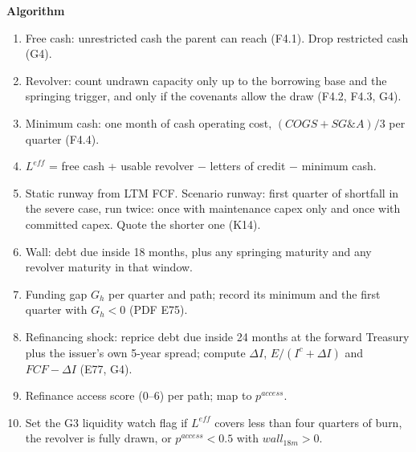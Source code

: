 \documentclass[11pt]{article}
\newcommand{\fld}[1]{\par\medskip\noindent\textbf{\textcolor{steel}{#1}}\par\nopagebreak}
\begin{document}
\fld{Algorithm}
\begin{algobox}
\begin{enumerate}
\item Free cash: unrestricted cash the parent can reach (F4.1). Drop restricted cash (G4).
\item Revolver: count undrawn capacity only up to the borrowing base and the springing trigger, and only if the covenants allow the draw (F4.2, F4.3, G4).
\item Minimum cash: one month of cash operating cost, $(COGS + SG\&A)/3$ per quarter (F4.4).
\item $L^{eff}$ = free cash + usable revolver $-$ letters of credit $-$ minimum cash.
\item Static runway from LTM FCF. Scenario runway: first quarter of shortfall in the severe case, run twice: once with maintenance capex only and once with committed capex. Quote the shorter one (K14).
\item Wall: debt due inside 18 months, plus any springing maturity and any revolver maturity in that window.
\item Funding gap $G_h$ per quarter and path; record its minimum and the first quarter with $G_h<0$ (PDF E75).
\item Refinancing shock: reprice debt due inside 24 months at the forward Treasury plus the issuer's own 5-year spread; compute $\Delta I$, $E/(I^c+\Delta I)$ and $FCF-\Delta I$ (E77, G4).
\item Refinance access score (0--6) per path; map to $p^{access}$.
\item Set the G3 liquidity watch flag if $L^{eff}$ covers less than four quarters of burn, the revolver is fully drawn, or $p^{access}<0.5$ with $wall_{18m}>0$.
\end{enumerate}
\end{algobox}
\end{document}
